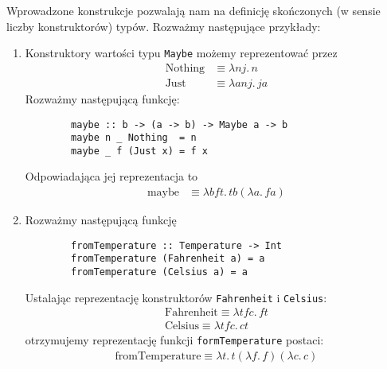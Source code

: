 \begin{przyklad}
  Wprowadzone konstrukcje pozwalają nam na definicję skończonych (w sensie liczby konstruktorów) typów. Rozważmy następujące przykłady:
  \begin{enumerate}[label=\alph*)]
    \setlength\itemsep{0em}
    \item Konstruktory wartości typu \texttt{Maybe} możemy reprezentować przez
      \begin{align*}
        \mathrm{Nothing}&\equiv \lambda nj.\,n\\
        \mathrm{Just}&\equiv \lambda anj.\,j a
      \end{align*}
      Rozważmy następującą funkcję:
      \begin{verbatim}
        maybe :: b -> (a -> b) -> Maybe a -> b
        maybe n _ Nothing  = n
        maybe _ f (Just x) = f x
      \end{verbatim}
      Odpowiadająca jej reprezentacja to
      \begin{align*}
        \mathrm{maybe} &\equiv \lambda b f t.\, tb(\lambda a.\,fa) 
      \end{align*}
    \item Rozważmy następującą funkcję
      \begin{verbatim}
        fromTemperature :: Temperature -> Int
        fromTemperature (Fahrenheit a) = a
        fromTemperature (Celsius a) = a
      \end{verbatim}
      Ustalając reprezentację konstruktorów \texttt{Fahrenheit} i \texttt{Celsius}:
      \begin{align*}
        \mathrm{Fahrenheit}\equiv \lambda tfc.\,ft\\
        \mathrm{Celsius}\equiv \lambda tfc.\,ct
      \end{align*}
      otrzymujemy reprezentację funkcji \texttt{formTemperature} postaci:
      \begin{align*}
        \mathrm{fromTemperature}\equiv\lambda t.\,t(\lambda f.\,f)(\lambda c.\,c)
      \end{align*}
  \end{enumerate}
\end{przyklad}

